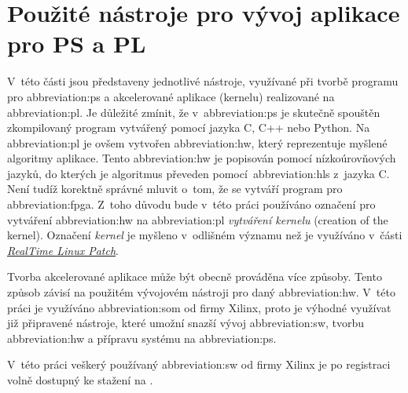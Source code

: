 \documentclass[a4paper, twoside, 11pt]{article}
\begin{document}
\section{Použité nástroje pro vývoj aplikace pro PS a PL}
V~této části jsou představeny jednotlivé nástroje, využívané při tvorbě programu pro \gls{abbreviation:ps} a akcelerované aplikace (kernelu) realizované na \gls{abbreviation:pl}. Je důležité zmínit, že v~\gls{abbreviation:ps} je skutečně spouštěn zkompilovaný program vytvářený pomocí jazyka C, C++ nebo Python. Na \gls{abbreviation:pl} je ovšem vytvořen \gls{abbreviation:hw}, který reprezentuje myšlené algoritmy aplikace. Tento \gls{abbreviation:hw} je popisován pomocí nízkoúrovňových jazyků, do kterých je algoritmus převeden pomocí~\gls{abbreviation:hls} z~jazyka C. Není tudíž korektně správné mluvit o~tom, že se vytváří program pro \gls{abbreviation:fpga}. Z~toho důvodu bude v~této práci používáno označení pro vytváření \gls{abbreviation:hw} na \gls{abbreviation:pl} \textit{vytváření kernelu} (creation of the kernel). Označení \textit{kernel} je myšleno v~odlišném významu než je využíváno v~části \hyperref[subsec:real-time-linux-patch]{\textit{RealTime Linux Patch}}.\par
Tvorba akcelerované aplikace může být obecně prováděna více způsoby. Tento způsob závisí na použitém vývojovém nástroji pro daný \gls{abbreviation:hw}. V~této práci je využíváno \gls{abbreviation:som} od firmy Xilinx, proto je výhodné využívat již připravené nástroje, které umožní snazší vývoj \gls{abbreviation:sw}, tvorbu \gls{abbreviation:hw} a přípravu systému na \gls{abbreviation:ps}.\par
	V~této práci veškerý používaný \gls{abbreviation:sw} od firmy Xilinx je po registraci volně dostupný ke stažení na \cite{xilinx-downloads}.
\end{document}
